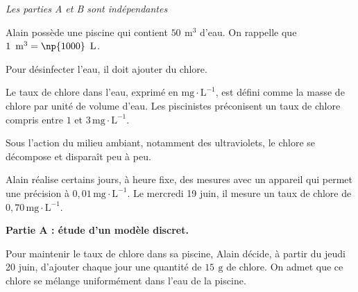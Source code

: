 \medskip

\emph{Les parties {\rm A} et {\rm B} sont indépendantes}

\medskip
Alain possède une piscine qui contient $50\, \mathrm{~m}^{3}$ d'eau. On rappelle que $1\, \mathrm{~m}^{3}=\np{1000}\, \mathrm{~L}$.

Pour désinfecter l'eau, il doit ajouter du chlore.

Le taux de chlore dans l'eau, exprimé en $\mathrm{mg}\cdot \mathrm{L}^{-1}$, est défini comme la masse de chlore par unité de volume d'eau. Les piscinistes préconisent un taux de chlore compris entre $1$ et $3\, \mathrm{mg \cdot L}^{-1}$.

Sous l'action du milieu ambiant, notamment des ultraviolets, le chlore se décompose et disparaît peu à peu.

Alain réalise certains jours, à heure fixe, des mesures avec un appareil qui permet une précision à $0,01 \,\mathrm{mg \cdot L}^{-1}$. Le mercredi 19 juin, il mesure un taux de chlore de $0,70\,\mathrm{mg \cdot L}^{-1}$.

\medskip

\textbf{Partie A : étude d'un modèle discret.}

\smallskip
Pour maintenir le taux de chlore dans sa piscine, Alain décide, à partir du jeudi 20 juin, d'ajouter chaque jour une quantité de $15\, \mathrm{~g}$ de chlore. On admet que ce chlore se mélange uniformément dans l'eau de la piscine.

